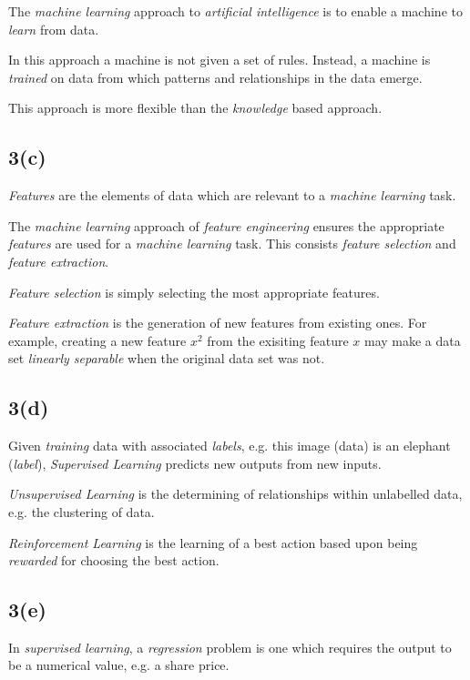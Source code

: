 \documentclass[12pt, a4paper,reqno]{article}
\begin{document}
The \emph{machine learning} approach to \emph{artificial intelligence} is to enable a machine to \emph{learn} from data.

In this approach a machine is not given a set of rules. Instead, a machine is \emph{trained} on data from which patterns and relationships in the data emerge.     

This approach is more flexible than the \emph{knowledge} based approach.

\subsection*{3(c)}

\emph{Features} are the elements of data which are relevant to a \emph{machine learning} task.

The \emph{machine learning} approach of \emph{feature engineering} ensures the appropriate \emph{features} are used for a \emph{machine learning} task. This consists \emph{feature selection} and \emph{feature extraction}.

\emph{Feature selection} is simply selecting the most appropriate features.

\emph{Feature extraction} is the generation of new features from existing ones. For example, creating a new feature $x^2$ from the exisiting feature $x$ may make a data set \emph{linearly separable} when the original data set was not. 

\subsection*{3(d)}

Given \emph{training} data with associated \emph{labels}, e.g. this image (data) is an elephant (\emph{label}), \emph{Supervised Learning} predicts new outputs from new inputs. 

\emph{Unsupervised Learning} is the determining of relationships within unlabelled data, e.g. the clustering of data.

\emph{Reinforcement Learning} is the learning of a best action based upon being \emph{rewarded} for choosing the best action.

\subsection*{3(e)}

In \emph{supervised learning}, a \emph{regression} problem is one which requires the output to be a numerical value, e.g. a share price.
\end{document}
